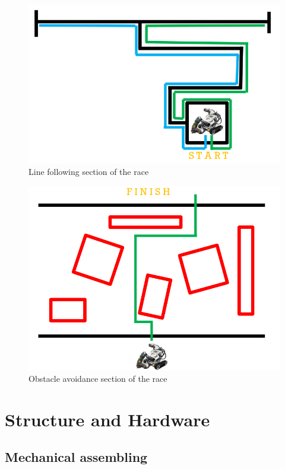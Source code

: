 \documentclass[a4paper,11pt,oneside]{book}
\begin{document}
		\begin{figure}
			\centering
			\includegraphics[scale=0.55]{figs/lineFollowingArena}
			\caption{Line following section of the race}\label{fig:lineFollowingArena.png}
		\end{figure}
		
		\begin{figure}
			\centering
			\includegraphics[scale=0.55]{figs/obstacleArena}
			\caption{Obstacle avoidance section of the race}\label{fig:obstacleArena.png}
		\end{figure}
		
		
			\section{Structure and Hardware}
			\subsection {Mechanical assembling}
			
\end{document}
